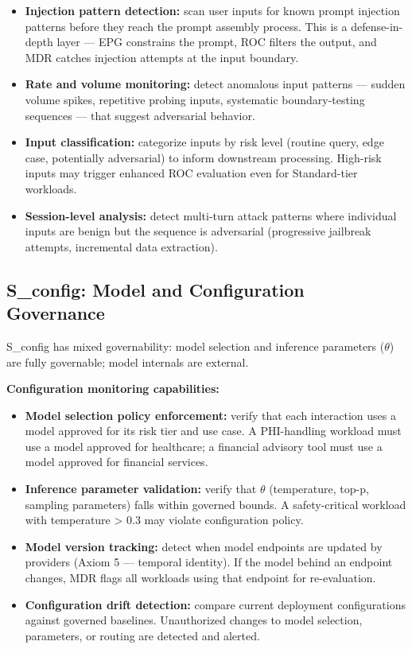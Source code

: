 \begin{itemize}
  \item \textbf{Injection pattern detection:} scan user inputs for known prompt injection patterns before they reach the prompt assembly process. This is a defense-in-depth layer --- EPG constrains the prompt, ROC filters the output, and MDR catches injection attempts at the input boundary.
  \item \textbf{Rate and volume monitoring:} detect anomalous input patterns --- sudden volume spikes, repetitive probing inputs, systematic boundary-testing sequences --- that suggest adversarial behavior.
  \item \textbf{Input classification:} categorize inputs by risk level (routine query, edge case, potentially adversarial) to inform downstream processing. High-risk inputs may trigger enhanced ROC evaluation even for Standard-tier workloads.
  \item \textbf{Session-level analysis:} detect multi-turn attack patterns where individual inputs are benign but the sequence is adversarial (progressive jailbreak attempts, incremental data extraction).
\end{itemize}


\subsection{S\_config: Model and Configuration Governance}


S\_\allowbreak{}config has mixed governability: model selection and inference parameters ($\theta$) are fully governable; model internals are external.

\textbf{Configuration monitoring capabilities:}

\begin{itemize}
  \item \textbf{Model selection policy enforcement:} verify that each interaction uses a model approved for its risk tier and use case. A PHI-handling workload must use a model approved for healthcare; a financial advisory tool must use a model approved for financial services.
  \item \textbf{Inference parameter validation:} verify that $\theta$ (temperature, top-p, sampling parameters) falls within governed bounds. A safety-critical workload with temperature > 0.3 may violate configuration policy.
  \item \textbf{Model version tracking:} detect when model endpoints are updated by providers (Axiom 5 --- temporal identity). If the model behind an endpoint changes, MDR flags all workloads using that endpoint for re-evaluation.
  \item \textbf{Configuration drift detection:} compare current deployment configurations against governed baselines. Unauthorized changes to model selection, parameters, or routing are detected and alerted.
\end{itemize}




